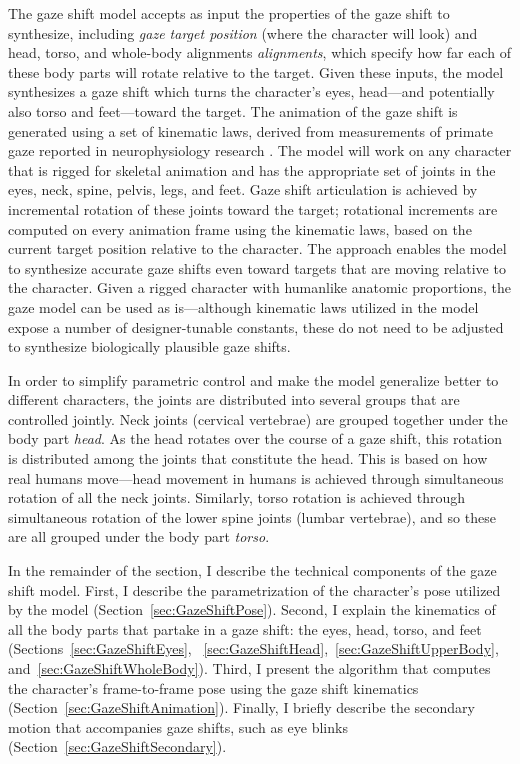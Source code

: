 The gaze shift model accepts as input the properties of the gaze shift to synthesize, including \emph{gaze target position} (where the character will look) and head, torso, and whole-body alignments \emph{alignments}, which specify how far each of these body parts will rotate relative to the target. Given these inputs, the model synthesizes a gaze shift which turns the character's eyes, head---and potentially also torso and feet---toward the target. The animation of the gaze shift is generated using a set of kinematic laws, derived from measurements of primate gaze reported in neurophysiology research \citep{baloh1975quantitative,guitton1987gaze,freedman2000coordination,hollands2004wholebody,mccluskey2007monkeys}.
The model will work on any character that is rigged for skeletal animation and has the appropriate set of joints in the eyes, neck, spine, pelvis, legs, and feet. Gaze shift articulation is achieved by incremental rotation of these joints toward the target; rotational increments are computed on every animation frame using the kinematic laws, based on the current target position relative to the character. The approach enables the model to synthesize accurate gaze shifts even toward targets that are moving relative to the character. Given a rigged character with humanlike anatomic proportions, the gaze model can be used as is---although kinematic laws utilized in the model expose a number of designer-tunable constants, these do not need to be adjusted to synthesize biologically plausible gaze shifts.

In order to simplify parametric control and make the model generalize better to different characters, the joints are distributed into several groups that are controlled jointly. Neck joints (cervical vertebrae) are grouped together under the body part \emph{head}. As the head rotates over the course of a gaze shift, this rotation is distributed among the joints that constitute the head. This is based on how real humans move---head movement in humans is achieved through simultaneous rotation of all the neck joints. Similarly, torso rotation is achieved through simultaneous rotation of the lower spine joints (lumbar vertebrae), and so these are all grouped under the body part \emph{torso}.

In the remainder of the section, I describe the technical components of the gaze shift model. First, I describe the parametrization of the character's pose utilized by the model (Section~\ref{sec:GazeShiftPose}). Second, I explain the kinematics of all the body parts that partake in a gaze shift: the eyes, head, torso, and feet (Sections~\ref{sec:GazeShiftEyes}, ~\ref{sec:GazeShiftHead},~\ref{sec:GazeShiftUpperBody}, and~\ref{sec:GazeShiftWholeBody}). Third, I present the algorithm that computes the character's frame-to-frame pose using the gaze shift kinematics (Section~\ref{sec:GazeShiftAnimation}). Finally, I briefly describe the secondary motion that accompanies gaze shifts, such as eye blinks (Section~\ref{sec:GazeShiftSecondary}).

